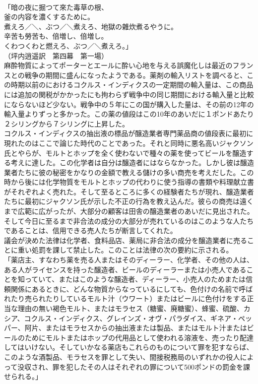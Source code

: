 \documentclass[8pt]{extreport}
\begin{document}
\begin{CJK}{UTF8}{min}
\\	「暗の夜に掘つて來た毒草の根、
\\	釜の内容を濃くするために。
\\	煮えろ／＼、ぶつ／＼煮えろ、地獄の雜炊煮るやうに。
\\	辛苦も勞苦も、倍増し、倍増し。
\\	くわつくわと燃えろ、ぶつ／＼煮えろ。」
\\	（坪内逍遥訳　第四幕　第一場）
\\	麻酔物質によってポーターとエールに酔い心地を与える誤魔化しは最近のフランスとの戦争の期間に盛んになったようである。薬剤の輸入リストを調べると、この時期以前のにおけるコクルス・インディクスの一定期間の輸入量は、この商品には追加の関税がかかったにも拘わらず戦争中の同じ期間における輸入量と比較にならないほど少ない。戦争中の５年にこの国が購入した量は、その前の12年の輸入量よりずっと多かった。この薬の値段はこの10年のあいだに１ポンドあたり２シリングから７シリングに上昇した。
\\	コクルス・インディクスの抽出液の標品が醸造業者専門薬品商の値段表に最初に現れたのはここで論じた時代のことであった。それと同時に悪名高いジャクソン氏とやらが、モルトとホップを全く使わないで種々の薬を使ってビールを醸造する考えに達した。この化学者は自分は醸造者にはならなかった。しかし彼は醸造業者たちに彼の秘密をかなりの金額で教える儲けの多い商売を考えだした。この時から後には化学物質をモルトとホップの代わりに使う指導の書類や料理献立書がそれぞれよく売れた。そして至るところに多くの経験者たちが現れ、醸造業者たちに最初にジャクソン氏が示した不正の行為を教え込んだ。彼らの商売は遠くまで広範に広がったが、大部分の顧客は田舎の醸造業者のあいだに見出された。そして今日に至るまで非合法の成分の大部分が売れているのはこのような人たちであることは、信用できる売人たちが断言してくれた。
\\	議会が決めた法律は化学者、食料品店、薬局に非合法の成分を醸造業者に売ることに重い処罰を課して禁止した。このことは法律の次の要約に示される。
\\	「薬店主、すなわち薬を売る人またはそのディーラー、化学者、その他の人は、ある人がライセンスを持った醸造者、ビールのディーラーまたは小売人であることを知っていて、またはこのような醸造者、ディーラー、小売人のためまたは信頼関係にあるときに、どんな物質からなっているにしても、色付けの名前で呼ばれたり売られたりしているモルト汁（ウワート）またはビールに色付けをする正当な理由の無い褐色モルト、またはモラセス（糖蜜、廃糖蜜）、蜂蜜、硫酸、カシア、コクルス・インディクス、グレインズ・オヴ・パラダイス、ギネア・ペッパー、阿片、またはモラセスからの抽出液または製品、またはモルト汁またはビールのためにモルトまたはホップの代用品として使われる溶液を、売ったり配達してはいけない。そしていかなる薬店もこれらのものについて罪を犯すならば、このような酒製品、モラセスを罪として失い、間接税務局のいずれかの役人によって没収され、罪を犯したその人はそれぞれの罪について500ポンドの罰金を課せられる。」

\end{CJK}
\end{document}
